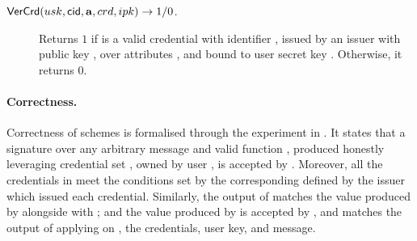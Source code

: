 \begin{description}
\item[$\mathsf{VerCrd}(usk,\mathsf{cid},\mathbf{a},crd,ipk) \rightarrow 1/0$.] Returns
  $1$ if \cred is a valid credential with identifier \cid, issued by an issuer
  with public key \ipk, over attributes \attrs, and bound to user secret key
  \usk. Otherwise, it returns $0$.
\end{description}


\paragraph{Correctness.} %
Correctness of \UAS schemes is formalised through the experiment in
. It states that a signature over any arbitrary message
and valid function \feval, produced honestly leveraging credential set \scid,
owned by user \uid, is accepted by \Verify. Moreover, all the credentials in
\scid meet the conditions set by the corresponding \fissue defined by the issuer
which issued each credential. Similarly, the output of \feval matches the
value produced by \Sign alongside with \sig; and the value produced by \Open
is accepted by \Judge, and matches the output of applying \finsp on \Yeval, the
credentials, user key, and message.

